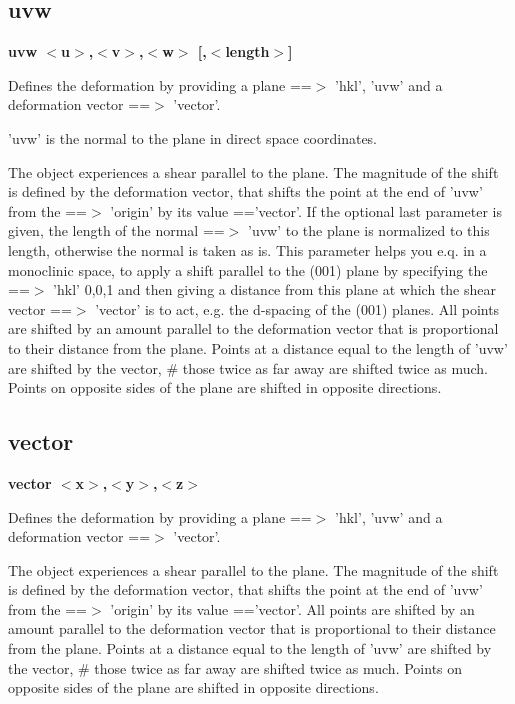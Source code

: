 \subsection*{uvw}
{\bf uvw $ <$u$> $,$ <$v$> $,$ <$w$> $ [,$ <$length$> $] \par }
\par
\vspace{3pt}
Defines the deformation by providing a plane ==$> $ 'hkl', 'uvw' and 
a deformation vector ==$> $ 'vector'. 
\par
'uvw' is the normal to the plane in direct space coordinates. 
\par
The object experiences a shear parallel to the plane. The 
magnitude of the shift is defined by the deformation vector, 
that shifts the point at the end of 'uvw' from the ==$> $ 'origin' 
by its value =='vector'. 
If the optional last parameter is given, the length of the normal 
==$> $ 'uvw' to the plane is normalized to this length, otherwise the 
normal is taken as is. This parameter helps you e.q. in a monoclinic 
space, to apply a shift parallel to the (001) plane by specifying 
the ==$> $ 'hkl' 0,0,1 and then giving a distance from this plane at 
which the shear vector ==$> $ 'vector' is to act, e.g. the d-spacing 
of the (001) planes. 
All points are shifted by an amount parallel to the deformation vector 
that is proportional to their distance from the plane. Points at 
a distance equal to the length of 'uvw' are shifted by the vector, \# 
those twice as far away are shifted twice as much. Points on 
opposite sides of the plane are shifted in opposite directions. 
\subsection*{vector}
{\bf vector $ <$x$> $,$ <$y$> $,$ <$z$> $ \par }
\par
\vspace{3pt}
Defines the deformation by providing a plane ==$> $ 'hkl', 'uvw' and 
a deformation vector ==$> $ 'vector'. 
\par
The object experiences a shear parallel to the plane. The 
magnitude of the shift is defined by the deformation vector, 
that shifts the point at the end of 'uvw' from the ==$> $ 'origin' 
by its value =='vector'. 
All points are shifted by an amount parallel to the deformation vector 
that is proportional to their distance from the plane. Points at 
a distance equal to the length of 'uvw' are shifted by the vector, \# 
those twice as far away are shifted twice as much. Points on 
opposite sides of the plane are shifted in opposite directions. 
